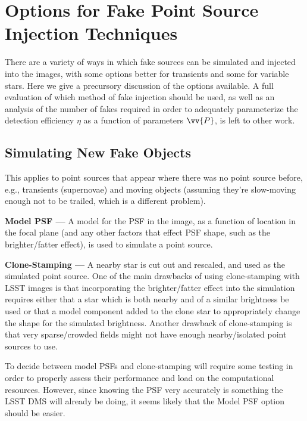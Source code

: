 \documentclass[DM,lsstdraft,toc]{lsstdoc}
\begin{document}
\section{Options for Fake Point Source Injection Techniques}\label{sec:opts_fakes}

There are a variety of ways in which fake sources can be simulated and injected into the images, with some options better for transients and some for variable stars. Here we give a precursory discussion of the options available. A full evaluation of which method of fake injection should be used, as well as an analysis of the number of fakes required in order to adequately parameterize the detection efficiency $\eta$ as a function of parameters $\vv{P}$, is left to other work.

\subsection{Simulating New Fake Objects}

This applies to point sources that appear where there was no point source before, e.g., transients (supernovae) and moving objects (assuming they're slow-moving enough not to be trailed, which is a different problem).

{\bf Model PSF ---} A model for the PSF in the image, as a function of location in the focal plane (and any other factors that effect PSF shape, such as the brighter/fatter effect), is used to simulate a point source. 

{\bf Clone-Stamping ---} A nearby star is cut out and rescaled, and used as the simulated point source. One of the main drawbacks of using clone-stamping with LSST images is that incorporating the brighter/fatter effect into the simulation requires either that a star which is both nearby and of a similar brightness be used or that a model component added to the clone star to appropriately change the shape for the simulated brightness. Another drawback of clone-stamping is that very sparse/crowded fields might not have enough nearby/isolated point sources to use.

To decide between model PSFs and clone-stamping will require some testing in order to properly assess their performance and load on the computational resources. However, since knowing the PSF very accurately is something the LSST DMS will already be doing, it seems likely that the Model PSF option should be easier.
\end{document}
